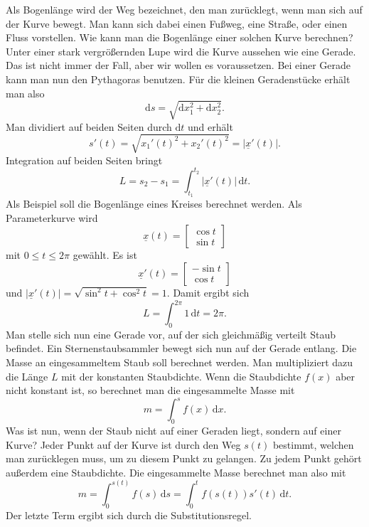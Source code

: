 \documentclass[a4paper,11pt,fleqn,twocolumn,twoside]{scrartcl}
\numberwithin{equation}{section}
\begin{document}
Als Bogenlänge wird der Weg bezeichnet, den man zurücklegt, wenn
man sich auf der Kurve bewegt. Man kann sich dabei einen Fußweg,
eine Straße, oder einen Fluss vorstellen. Wie kann man die
Bogenlänge einer solchen Kurve berechnen?
Unter einer stark vergrößernden Lupe wird die Kurve aussehen wie
eine Gerade. Das ist nicht immer der Fall, aber wir wollen es
voraussetzen. Bei einer Gerade kann man nun den Pythagoras benutzen.
Für die kleinen Geradenstücke erhält man also
\begin{equation}
\mathrm ds = \sqrt{\mathrm dx_1^2+\mathrm dx_2^2}.
\end{equation}
Man dividiert auf beiden Seiten durch $\mathrm dt$ und erhält
\begin{equation}
s'(t) = \sqrt{x_1'(t)^2+x_2'(t)^2} = |\underline x'(t)|.
\end{equation}
Integration auf beiden Seiten bringt
\begin{equation}
L = s_2-s_1 = \int_{t_1}^{t_2} |\underline x'(t)|\,\mathrm dt.
\end{equation}
%
Als Beispiel soll die Bogenlänge eines Kreises berechnet werden.
Als Parameterkurve wird
\begin{equation}
\underline x(t) = \begin{bmatrix}\cos t\\ \sin t\end{bmatrix}
\end{equation}
mit $0\le t\le 2\pi$ gewählt. Es ist
\begin{equation}
\underline x'(t) = \begin{bmatrix}-\sin t\\ \cos t\end{bmatrix}
\end{equation}
und $|\underline x'(t)|=\sqrt{\sin^2 t+\cos^2 t}=1$.
Damit ergibt sich
\begin{equation}
L = \int_0^{2\pi} 1\,\mathrm dt=2\pi.
\end{equation}
%
Man stelle sich nun eine Gerade vor, auf der sich gleichmäßig
verteilt Staub befindet. Ein Sternenstaubsammler bewegt sich nun auf
der Gerade entlang. Die Masse an eingesammeltem Staub soll
berechnet werden. Man multipliziert dazu die Länge $L$ mit der
konstanten Staubdichte. Wenn die Staubdichte $f(x)$ aber nicht
konstant ist, so berechnet man die eingesammelte Masse mit
\begin{equation}
m = \int_0^s f(x)\,\mathrm dx.
\end{equation}
%
Was ist nun, wenn der Staub nicht auf einer Geraden liegt, sondern auf
einer Kurve? Jeder Punkt auf der Kurve ist durch den Weg $s(t)$
bestimmt, welchen man zurücklegen muss, um zu diesem Punkt zu
gelangen. Zu jedem Punkt gehört außerdem eine Staubdichte. Die
eingesammelte Masse berechnet man also mit
\begin{equation}
m = \int_0^{s(t)} f(s)\,\mathrm ds
= \int_0^t f(s(t))s'(t)\,\mathrm dt.
\end{equation}
Der letzte Term ergibt sich durch die Substitutionsregel.
\end{document}
